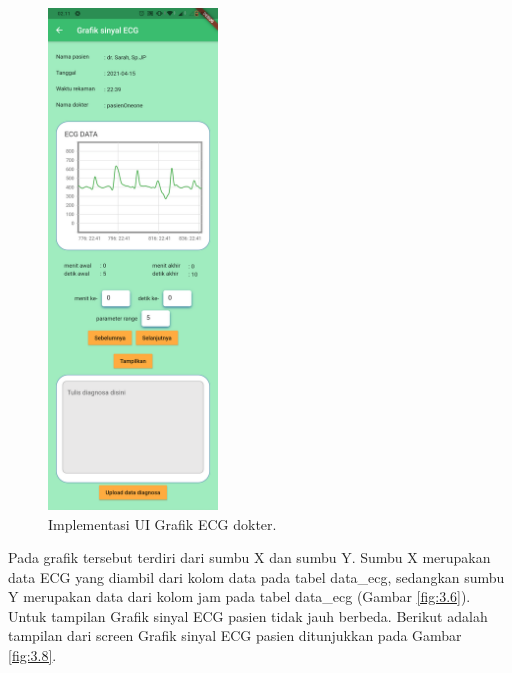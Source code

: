 \begin{figure}[H] \centering
	\includegraphics[width=0.4\textwidth]{img/layar_grafikECGdokter.png}
	\caption{Implementasi UI Grafik ECG dokter.}
	\label{fig:3.7}
\end{figure}

Pada grafik tersebut terdiri dari sumbu X dan sumbu Y. Sumbu X merupakan data ECG yang diambil dari kolom data pada tabel data\_ecg, sedangkan sumbu Y merupakan data dari kolom jam pada tabel data\_ecg (Gambar \ref{fig:3.6}). Untuk tampilan Grafik sinyal ECG pasien tidak jauh berbeda. Berikut adalah tampilan dari screen Grafik sinyal ECG pasien ditunjukkan pada Gambar \ref{fig:3.8}.


